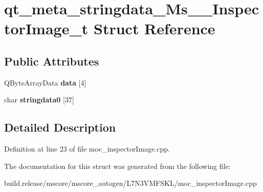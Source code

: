 \hypertarget{structqt__meta__stringdata___ms_____inspector_image__t}{}\section{qt\+\_\+meta\+\_\+stringdata\+\_\+\+Ms\+\_\+\+\_\+\+Inspector\+Image\+\_\+t Struct Reference}
\label{structqt__meta__stringdata___ms_____inspector_image__t}
\subsection*{Public Attributes}
\begin{DoxyCompactItemize}
\item 
\mbox{\label{structqt__meta__stringdata___ms_____inspector_image__t_a07933fc4b5e846ab82b37add72e30405}} 
Q\+Byte\+Array\+Data {\bfseries data} \mbox{[}4\mbox{]}
\item 
\mbox{\label{structqt__meta__stringdata___ms_____inspector_image__t_ae48b361341ebe5edf1fb1c88025f0e2a}} 
char {\bfseries stringdata0} \mbox{[}37\mbox{]}
\end{DoxyCompactItemize}


\subsection{Detailed Description}


Definition at line 23 of file moc\+\_\+inspector\+Image.\+cpp.



The documentation for this struct was generated from the following file\+:\begin{DoxyCompactItemize}
\item 
build.\+release/mscore/mscore\+\_\+autogen/\+L7\+N3\+V\+M\+F\+S\+K\+L/moc\+\_\+inspector\+Image.\+cpp\end{DoxyCompactItemize}
